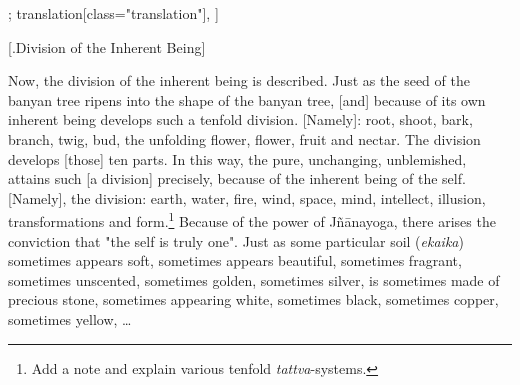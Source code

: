 \begin{alignment}[
  texts=edition[class="edition"];
  translation[class="translation"],
  ]
  \begin{translation}
 \centerline{\textrm{\small{[.\textsuperscript{}Division of the Inherent Being]}}}
          \bigskip
          \begin{tlate}
 Now, the division of the inherent being is described. Just as the seed of the banyan tree ripens into the shape of the banyan tree, [and] because of its own inherent being develops such a tenfold division. [Namely]: root, shoot, bark, branch, twig, bud, the unfolding flower, flower, fruit and nectar. The division develops [those] ten parts. In this way, the pure, unchanging, unblemished, attains such [a division] precisely, because of the inherent being of the self. [Namely], the division: earth, water, fire, wind, space, mind, intellect, illusion, transformations and form.\footnote{Add a note and explain various tenfold \textit{tattva}-systems.}\textsuperscript{\coro{[\lowroman{5}]}} Because of the power of Jñānayoga, there arises the conviction that "the self is truly one". Just as some particular soil (\textit{ekaika}) sometimes appears soft, sometimes appears beautiful, sometimes fragrant, sometimes unscented, sometimes golden, sometimes silver, is sometimes made of precious stone, sometimes appearing white, sometimes black, sometimes copper, sometimes yellow, \ldots
            \end{tlate}
  \end{translation}
\end{alignment}
\ekdpb*{}
